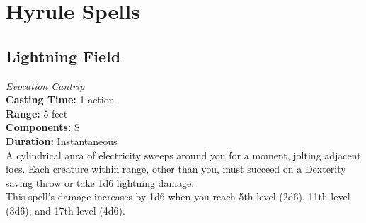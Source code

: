 \documentclass[10pt,twoside,twocolumn,openany]{book}
\begin{document}
\chapter{Hyrule Spells}

\section{Lightning Field}
\textit{Evocation Cantrip} \\

\noindent \textbf{Casting Time:} 1 action\\
\textbf{Range:} 5 feet\\
\textbf{Components:} S\\
\textbf{Duration:} Instantaneous\\

\noindent A cylindrical aura of electricity sweeps around you for a moment, jolting adjacent foes. Each creature within range, other than you, must succeed on a Dexterity saving throw or take 1d6 lightning damage. \\
This spell's damage increases by 1d6 when you reach 5th level (2d6), 11th level (3d6), and 17th level (4d6). \\







\end{document}
